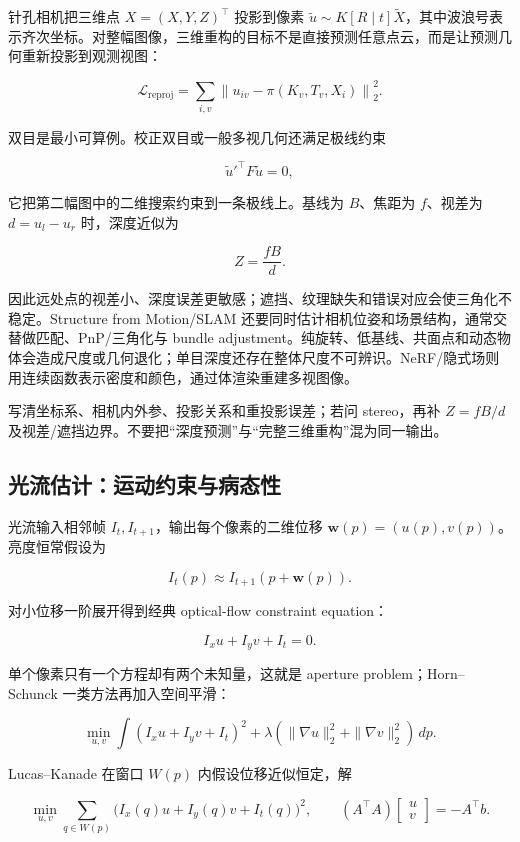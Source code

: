针孔相机把三维点 \(X=(X,Y,Z)^\top\) 投影到像素 \(\tilde u\sim K[R\mid t]\tilde X\)，其中波浪号表示齐次坐标。对整幅图像，三维重构的目标不是直接预测任意点云，而是让预测几何重新投影到观测视图：

\[
  \mathcal{L}_{\mathrm{reproj}}
  =
  \sum_{i,v}
  \left\|
    u_{iv}-\pi(K_v,T_v,X_i)
  \right\|_2^2.
\]

双目是最小可算例。校正双目或一般多视几何还满足极线约束

\[
  \tilde u'^{\top}F\tilde u=0,
\]

它把第二幅图中的二维搜索约束到一条极线上。基线为 \(B\)、焦距为 \(f\)、视差为 \(d=u_l-u_r\) 时，深度近似为

\[
  Z=\frac{fB}{d}.
\]

因此远处点的视差小、深度误差更敏感；遮挡、纹理缺失和错误对应会使三角化不稳定。Structure from Motion/SLAM 还要同时估计相机位姿和场景结构，通常交替做匹配、PnP/三角化与 bundle adjustment。纯旋转、低基线、共面点和动态物体会造成尺度或几何退化；单目深度还存在整体尺度不可辨识。NeRF/隐式场则用连续函数表示密度和颜色，通过体渲染重建多视图像。

\begin{examnote}[三维题答题骨架]
写清坐标系、相机内外参、投影关系和重投影误差；若问 stereo，再补 \(Z=fB/d\) 及视差/遮挡边界。不要把“深度预测”与“完整三维重构”混为同一输出。
\end{examnote}

\subsection{光流估计：运动约束与病态性}

光流输入相邻帧 \(I_t,I_{t+1}\)，输出每个像素的二维位移 \(\mathbf w(p)=(u(p),v(p))\)。亮度恒常假设为

\[
  I_t(p)\approx I_{t+1}(p+\mathbf w(p)).
\]

对小位移一阶展开得到经典 optical-flow constraint equation：

\[
  I_xu+I_yv+I_t=0.
\]

单个像素只有一个方程却有两个未知量，这就是 aperture problem；Horn--Schunck 一类方法再加入空间平滑：

\[
  \min_{u,v}
  \int
  (I_xu+I_yv+I_t)^2
  +\lambda(\|\nabla u\|_2^2+\|\nabla v\|_2^2)\,dp.
\]

Lucas--Kanade 在窗口 \(W(p)\) 内假设位移近似恒定，解

\[
  \min_{u,v}\sum_{q\in W(p)}
  \bigl(I_x(q)u+I_y(q)v+I_t(q)\bigr)^2,
  \qquad
  (A^\top A)\begin{bmatrix}u\\v\end{bmatrix}
  =-A^\top b.
\]

